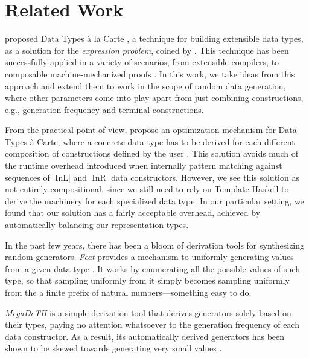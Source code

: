 \section{Related Work}
\label{sec:related}

\citeauthor{SwierstraDTC} proposed Data Types \`a la Carte \cite{SwierstraDTC},
a technique for building extensible data types, as a solution for the
\emph{expression problem}, coined by \citeauthor{wadler1998expression}
\cite{wadler1998expression}.
%
This technique has been successfully applied in a variety of scenarios, from
extensible compilers, to composable machine-mechanized proofs
\cite{Day:2013:CAL:2620678.2620680, persson2011generic, wu2014effect,
  delaware2013meta}.
%
In this work, we take ideas from this approach and extend them to work in the
scope of random data generation, where other parameters come into play apart
from just combining constructions, e.g., generation frequency and terminal
constructions.


From the practical point of view, \citeauthor{KiriyamaOptimizingDTC} propose an
optimization mechanism for Data Types \`a Carte, where a concrete data type has
to be derived for each different composition of constructions defined by the
user \cite{KiriyamaOptimizingDTC}.
%
This solution avoids much of the runtime overhead introduced when internally
pattern matching against sequences of |InL| and |InR| data constructors.
%
However, we see this solution as not entirely compositional, since we still need
to rely on Template Haskell to derive the machinery for each specialized data
type.
%
In our particular setting, we found that our solution has a fairly acceptable
overhead, achieved by automatically balancing our representation types.


In the past few years, there has been a bloom of derivation tools for
synthesizing random generators.
%
\emph{Feat} provides a mechanism to uniformly generating values from a given
data type \cite{DuregardJW12}.
%
It works by enumerating all the possible values of such type, so that sampling
uniformly from it simply becomes sampling uniformly from the a finite prefix of
natural numbers---something easy to do.


\emph{MegaDeTH} is a simple derivation tool that derives generators solely based
on their types, paying no attention whatsoever to the generation frequency of
each data constructor.
%
As a result, its automatically derived generators has been shown to be skewed
towards generating very small values
\cite{DBLP:conf/haskell/MistaRH18}.


